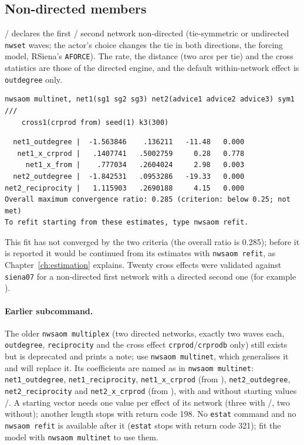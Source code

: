\subsection{Non-directed members}

 /  declares the first / second network non-directed (tie-symmetric or undirected \texttt{nwset} waves; the actor's choice changes the tie in both directions, the forcing model, RSiena's \texttt{AFORCE}). The rate, the distance (two arcs per tie) and the cross statistics are those of the directed engine, and the default within-network effect is \texttt{outdegree} only.
\begin{lstlisting}
nwsaom multinet, net1(sg1 sg2 sg3) net2(advice1 advice2 advice3) sym1 ///
    cross1(crprod from) seed(1) k3(300)
\end{lstlisting}
\begin{lstlisting}
  net1_outdegree |  -1.563846    .136211   -11.48   0.000
   net1_x_crprod |   .1407741   .5002759     0.28   0.778
     net1_x_from |    .777034   .2604024     2.98   0.003
  net2_outdegree |  -1.842531   .0953286   -19.33   0.000
net2_reciprocity |   1.115903   .2690188     4.15   0.000
Overall maximum convergence ratio: 0.285 (criterion: below 0.25; not met)
To refit starting from these estimates, type nwsaom refit.
\end{lstlisting}
This fit has not converged by the two criteria (the overall ratio is 0.285); before it is reported it would be continued from its estimates with \texttt{nwsaom refit}, as Chapter~\ref{ch:estimation} explains. Twenty cross effects were validated against \texttt{siena07} for a non-directed first network with a directed second one (for example ).

\paragraph{Earlier subcommand.} The older \texttt{nwsaom multiplex} (two directed networks, exactly two waves each, \texttt{outdegree}, \texttt{reciprocity} and the cross effect \texttt{crprod}/\texttt{crprodb} only) still exists but is deprecated and prints a note; use \texttt{nwsaom multinet}, which generalises it and will replace it. Its coefficients are named as in \texttt{nwsaom multinet}: \texttt{net1\_outdegree}, \texttt{net1\_reciprocity}, \texttt{net1\_x\_crprod} (from ), \texttt{net2\_outdegree}, \texttt{net2\_reciprocity} and \texttt{net2\_x\_crprod} (from ), with and without starting values /. A starting vector needs one value per effect of its network (three with /, two without); another length stops with return code 198. No \texttt{estat} command and no \texttt{nwsaom refit} is available after it (\texttt{estat} stops with return code 321); fit the model with \texttt{nwsaom multinet} to use them.

